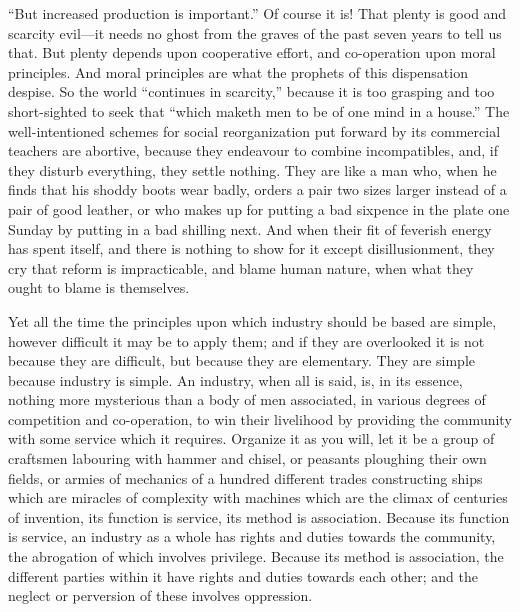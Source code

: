 \documentclass{book}
\begin{document}
“But increased production is important.” Of course it is! That plenty is good and scarcity evil—it needs no ghost from the graves of the past seven years to tell us that. But plenty depends upon cooperative effort, and co-operation upon moral principles. And moral principles are what the prophets of this dispensation despise. So the world “continues in scarcity,” because it is too grasping and too short-sighted to seek that “which maketh men to be of one mind in a house.” The well-intentioned schemes for social reorganization put forward by its commercial teachers are abortive, because they endeavour to combine incompatibles, and, if they disturb everything, they settle nothing. They are like a man who, when he finds that his shoddy boots wear badly, orders a pair two sizes larger instead of a pair of good leather, or who makes up for putting a bad sixpence in the plate one Sunday by putting in a bad shilling next. And when their fit of feverish energy has spent itself, and there is nothing to show for it except disillusionment, they cry that reform is impracticable, and blame human nature, when what they ought to blame is themselves.

Yet all the time the principles upon which industry should be based are simple, however difficult it may be to apply them; and if they are overlooked it is not because they are difficult, but because they are elementary. They are simple because industry is simple. An industry, when all is said, is, in its essence, nothing more mysterious than a body of men associated, in various degrees of competition and co-operation, to win their livelihood by providing the community with some service which it requires. Organize it as you will, let it be a group of craftsmen labouring with hammer and chisel, or peasants ploughing their own fields, or armies of mechanics of a hundred different trades constructing ships which are miracles of complexity with machines which are the climax of centuries of invention, its function is service, its method is association. Because its function is service, an industry as a whole has rights and duties towards the community, the abrogation of which involves privilege. Because its method is association, the different parties within it have rights and duties towards each other; and the neglect or perversion of these involves oppression.
\end{document}
